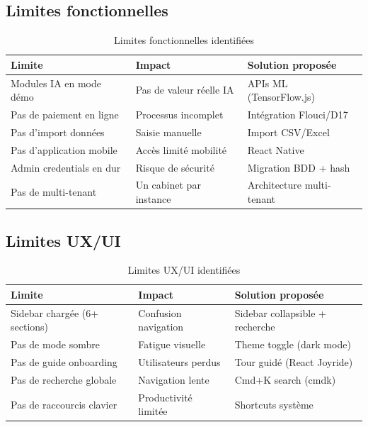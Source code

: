 \subsection{Limites fonctionnelles}

\begin{table}[H]
\centering
\caption{Limites fonctionnelles identifiées}
\label{tab:limits-func}
\begin{tabular}{|l|l|l|}
\hline
\textbf{Limite} & \textbf{Impact} & \textbf{Solution proposée} \\
\hline
Modules IA en mode démo & Pas de valeur réelle IA & APIs ML (TensorFlow.js) \\
\hline
Pas de paiement en ligne & Processus incomplet & Intégration Flouci/D17 \\
\hline
Pas d'import données & Saisie manuelle & Import CSV/Excel \\
\hline
Pas d'application mobile & Accès limité mobilité & React Native \\
\hline
Admin credentials en dur & Risque de sécurité & Migration BDD + hash \\
\hline
Pas de multi-tenant & Un cabinet par instance & Architecture multi-tenant \\
\hline
\end{tabular}
\end{table}

\subsection{Limites UX/UI}

\begin{table}[H]
\centering
\caption{Limites UX/UI identifiées}
\label{tab:limits-ux}
\begin{tabular}{|l|l|l|}
\hline
\textbf{Limite} & \textbf{Impact} & \textbf{Solution proposée} \\
\hline
Sidebar chargée (6+ sections) & Confusion navigation & Sidebar collapsible + recherche \\
\hline
Pas de mode sombre & Fatigue visuelle & Theme toggle (dark mode) \\
\hline
Pas de guide onboarding & Utilisateurs perdus & Tour guidé (React Joyride) \\
\hline
Pas de recherche globale & Navigation lente & Cmd+K search (cmdk) \\
\hline
Pas de raccourcis clavier & Productivité limitée & Shortcuts système \\
\hline
\end{tabular}
\end{table}

